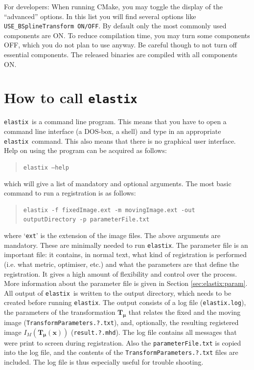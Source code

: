 \documentclass[]{report}
\newcommand{\elastix}{\texttt{elastix}}
\newcommand{\vmu}{\bm{\mu}}
\newcommand{\vT}{\bm{T}}
\newcommand{\vTmx}{\bm{T}_{\vmu}(\bm{x})}
\begin{document}
For developers: When running CMake, you may toggle the display of the
``advanced'' options. In this list you will find several options like
\texttt{USE\_BSplineTransform ON/OFF}. By default only the most commonly used
components are ON. To reduce compilation time, you may turn some components
OFF, which you do not plan to use anyway. Be careful though to not turn off
essential components. The released binaries are compiled with all components
ON.

\section{How to call \elastix}\label{sec:elastix:call}

\elastix\ is a command line program. This means that you have to
open a command line interface (a DOS-box, a shell) and type in an
appropriate \elastix\ command. This also means that there is no
graphical user interface. Help on using the program can be acquired
as follows:
\begin{quote}
\texttt{elastix --help}
\end{quote}
which will give a list of mandatory and optional arguments. The most
basic command to run a registration is as follows:
\begin{quote}
\texttt{elastix -f fixedImage.ext -m movingImage.ext -out
outputDirectory -p parameterFile.txt}
\end{quote}
where `\texttt{ext}' is the extension of the image files. The above
arguments are mandatory. These are minimally needed to run \elastix.
The parameter file is an important file: it contains, in normal
text, what kind of registration is performed (i.e. what metric,
optimiser, etc.) and what the parameters are that define the
registration. It gives a high amount of flexibility and control over
the process. More information about the parameter file is given in
Section \ref{sec:elastix:param}. All output of \elastix\ is written
to the output directory, which needs to be created before running
\elastix. The output consists of a log file (\texttt{elastix.log}),
the parameters of the transformation $\vT_{\vmu}$ that relates the
fixed and the moving image (\texttt{TransformParameters.?.txt}),
and, optionally, the resulting registered image $I_M(\vTmx)$
(\texttt{result.?.mhd}). The log file contains all messages that
were print to screen during registration. Also the
\texttt{parameterFile.txt} is copied into the log file, and the
contents of the \texttt{TransformParameters.?.txt} files are
included. The log file is thus especially useful for trouble
shooting.
\end{document}
